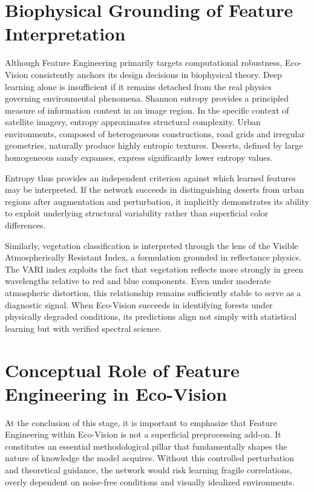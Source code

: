 \documentclass[12pt,a4paper]{report}
\begin{document}
\section{Biophysical Grounding of Feature Interpretation}

Although Feature Engineering primarily targets computational robustness, Eco-Vision consistently anchors its design decisions in biophysical theory. Deep learning alone is insufficient if it remains detached from the real physics governing environmental phenomena. Shannon entropy provides a principled measure of information content in an image region. In the specific context of satellite imagery, entropy approximates structural complexity. Urban environments, composed of heterogeneous constructions, road grids and irregular geometries, naturally produce highly entropic textures. Deserts, defined by large homogeneous sandy expanses, express significantly lower entropy values.

Entropy thus provides an independent criterion against which learned features may be interpreted. If the network succeeds in distinguishing deserts from urban regions after augmentation and perturbation, it implicitly demonstrates its ability to exploit underlying structural variability rather than superficial color differences.

Similarly, vegetation classification is interpreted through the lens of the Visible Atmospherically Resistant Index, a formulation grounded in reflectance physics. The VARI index exploits the fact that vegetation reflects more strongly in green wavelengths relative to red and blue components. Even under moderate atmospheric distortion, this relationship remains sufficiently stable to serve as a diagnostic signal. When Eco-Vision succeeds in identifying forests under physically degraded conditions, its predictions align not simply with statistical learning but with verified spectral science.

\section{Conceptual Role of Feature Engineering in Eco-Vision}

At the conclusion of this stage, it is important to emphasize that Feature Engineering within Eco-Vision is not a superficial preprocessing add-on. It constitutes an essential methodological pillar that fundamentally shapes the nature of knowledge the model acquires. Without this controlled perturbation and theoretical guidance, the network would risk learning fragile correlations, overly dependent on noise-free conditions and visually idealized environments.
\end{document}

